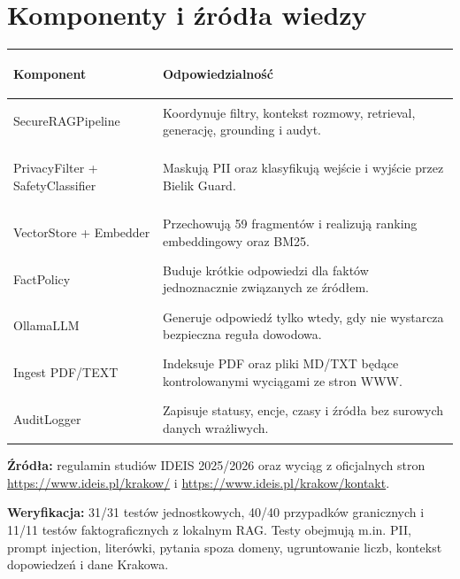 \documentclass[10pt,a4paper]{article}
\begin{document}
\section*{Komponenty i źródła wiedzy}

\begin{tabularx}{\textwidth}{@{}>{\bfseries\color{navy}\raggedright\arraybackslash}p{43mm}X@{}}
\toprule
Komponent & Odpowiedzialność \\
\midrule
SecureRAGPipeline & Koordynuje filtry, kontekst rozmowy, retrieval, generację, grounding i audyt. \\
PrivacyFilter + SafetyClassifier & Maskują PII oraz klasyfikują wejście i wyjście przez Bielik Guard. \\
VectorStore + Embedder & Przechowują 59 fragmentów i realizują ranking embeddingowy oraz BM25. \\
FactPolicy & Buduje krótkie odpowiedzi dla faktów jednoznacznie związanych ze źródłem. \\
OllamaLLM & Generuje odpowiedź tylko wtedy, gdy nie wystarcza bezpieczna reguła dowodowa. \\
Ingest PDF/TEXT & Indeksuje PDF oraz pliki MD/TXT będące kontrolowanymi wyciągami ze stron WWW. \\
AuditLogger & Zapisuje statusy, encje, czasy i źródła bez surowych danych wrażliwych. \\
\bottomrule
\end{tabularx}

\vspace{2mm}
\textbf{Źródła:} regulamin studiów IDEIS 2025/2026 oraz wyciąg z oficjalnych stron
\url{https://www.ideis.pl/krakow/} i \url{https://www.ideis.pl/krakow/kontakt}.

\textbf{Weryfikacja:} 31/31 testów jednostkowych, 40/40 przypadków granicznych i 11/11
testów faktograficznych z lokalnym RAG. Testy obejmują m.in. PII, prompt injection,
literówki, pytania spoza domeny, ugruntowanie liczb, kontekst dopowiedzeń i dane Krakowa.
\end{document}

